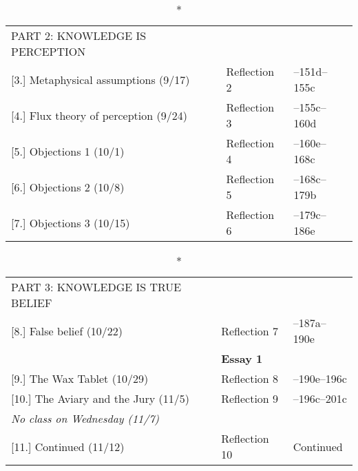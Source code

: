 \documentclass[article,oneside]{memoir}
\begin{document}
								
\begin{center}
\begin{longtable}{p{6cm}p{3cm}p{5cm}}
  \caption*{PART 2: KNOWLEDGE IS PERCEPTION} \\

		
[3.] Metaphysical assumptions  (9/17)		& Reflection 2		&  --151d--155c \\ 


[4.] Flux theory of perception  (9/24)		& Reflection 3		& --155c--160d \\ 


[5.] Objections 1  (10/1)				& Reflection 4		& --160e--168c \\ 


[6.] Objections 2 (10/8)				& Reflection 5		 & --168c--179b \\


[7.] Objections 3 (10/15)	   			& Reflection 6		 & --179c--186e    \\

\end{longtable}
\end{center}
\vspace{-1.5cm}
\begin{center}
\begin{longtable}{p{6cm}p{3cm}p{5cm}}
 
  \caption*{PART 3: KNOWLEDGE IS TRUE BELIEF	} \\
  					
  
[8.] False belief (10/22)			 	& Reflection 7		& --187a--190e  \\
								& \textbf{Essay 1}	&  \\



[9.] The Wax Tablet	(10/29)			& Reflection 8		& --190e--196c\\

[10.] The Aviary and the Jury	(11/5)	& Reflection 9		& --196c--201c \\ 

\emph{No class on Wednesday (11/7)}		    			& 				& \\

[11.] Continued (11/12)				& Reflection 10		& Continued \\ 

\end{longtable}
\end{center}
\end{document}
